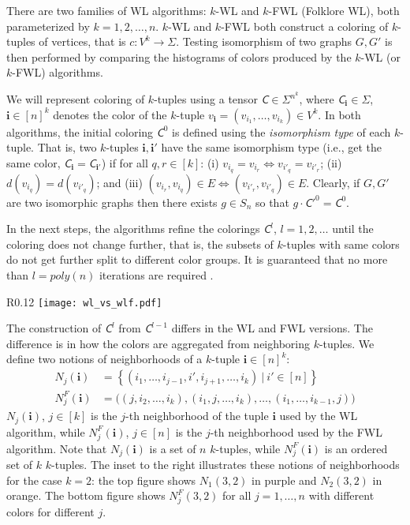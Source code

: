 \documentclass{article}
\newcommand{\set}[1]{\left\{#1\right\}}
\newcommand{\too}{\rightarrow}
\newcommand{\ie}{{i.e.}}
\def\vi{{\bm{i}}}
\newcommand{\tens}[1]{\bm{\mathsfit{#1}}}
\def\tC{{\tens{C}}}
\begin{document}
There are two families of WL algorithms: $k$-WL and $k$-FWL (Folklore WL), both parameterized by $k=1,2,\ldots,n$. 
$k$-WL and $k$-FWL both construct a coloring of $k$-tuples of vertices, that is $c:V^k \too \Sigma$. Testing isomorphism of two graphs $G,G'$ is then performed by comparing the histograms of colors produced by the $k$-WL (or $k$-FWL) algorithms.

We will represent coloring of $k$-tuples using a tensor $\tC \in \Sigma^{n^k}$, where $\tC_{\vi}\in \Sigma$, $\vi\in [n]^k$ denotes the color of the $k$-tuple $v_\vi=(v_{i_1},\ldots,v_{i_k}) \in V^k$.  In both algorithms, the initial coloring $\tC^0$ is defined using the \emph{isomorphism type} of each $k$-tuple. That is, two $k$-tuples $\vi,\vi'$ have the same isomorphism type (\ie, get the same color, $\tC_\vi=\tC_{\vi'}$) if for all $q,r\in [k]$: (i) $v_{i_q}=v_{i_r} \iff v_{i'_q}=v_{i'_r}$; (ii) $d(v_{i_q})=d(v_{i'_q})$; and (iii) $(v_{i_r},v_{i_q})\in E \iff (v_{i'_r},v_{i'_q})\in E$. Clearly, if $G,G'$ are two isomorphic graphs then there exists $g\in S_n$ so that  $g\cdot\tC'^{0}=\tC^{0}$. 

In the next steps, the algorithms refine the colorings $\tC^l$, $l=1,2,\ldots$ until the coloring does not change further, that is, the subsets of $k$-tuples with same colors do not get further split to different color groups. It is guaranteed that no more than $l=poly(n)$ iterations are required \citep{douglas2011weisfeiler}.   

\begin{wrapfigure}[7]{R}{0.12\textwidth}
\vspace{-12pt}
\texttt{[image: wl\_vs\_wlf.pdf]}
\vspace{10pt}
\end{wrapfigure}
The construction of $\tC^l$ from $\tC^{l-1}$ differs in the WL and FWL versions. The difference is in how the colors are aggregated from neighboring $k$-tuples. We define two notions of neighborhoods of a $k$-tuple $\vi\in[n]^k$:
\begin{align}
    N_j(\vi) &= \set{ (i_1,\ldots,i_{j-1},i',i_{j+1},\ldots,i_k) \ \Big \vert \  i'\in [n] }   \\
    N^F_j(\vi) &= \Big ( (j,i_2,\ldots,i_k), (i_1,j,\ldots,i_k), \ldots, (i_1,\ldots,i_{k-1},j) \Big )  
\end{align}
$N_j(\vi)$, $j\in [k]$ is the $j$-th neighborhood of the tuple $\vi$ used by the WL algorithm, while $N_j^F(\vi)$, $j\in[n]$ is the $j$-th neighborhood used by the FWL algorithm. Note that $N_j(\vi)$ is a set of $n$ $k$-tuples, while $N^F_j(\vi)$ is an ordered set of $k$  $k$-tuples. The inset to the right illustrates these notions of neighborhoods for the case $k=2$: the top figure shows $N_1(3,2)$ in purple and $N_2(3,2)$ in orange. The bottom figure shows $N^F_j(3,2)$ for all $j=1,\dots,n$ with different colors for different $j$.
\end{document}
